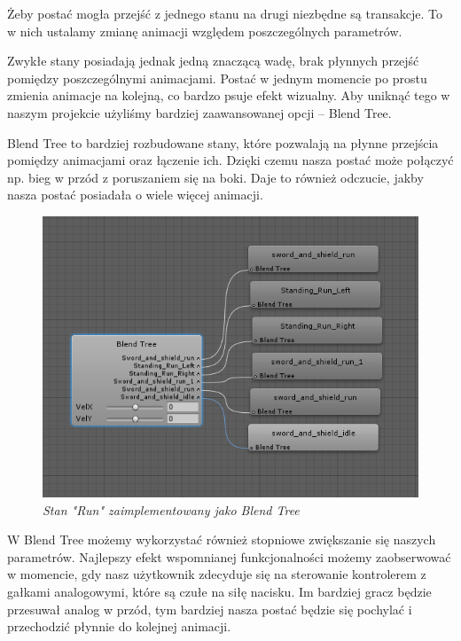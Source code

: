 \documentclass[openright]{xmgr}
\begin{document}
    Żeby postać mogła przejść z jednego stanu na drugi niezbędne są transakcje. To w nich ustalamy zmianę animacji względem poszczególnych parametrów. 

    Zwykłe stany posiadają jednak jedną znaczącą wadę, brak płynnych przejść pomiędzy poszczególnymi animacjami. Postać w jednym momencie po prostu zmienia animacje na kolejną, co bardzo psuje efekt wizualny. Aby uniknąć tego w naszym projekcie użyliśmy bardziej zaawansowanej opcji – Blend Tree.

    Blend Tree to bardziej rozbudowane stany, które pozwalają na płynne przejścia pomiędzy animacjami oraz łączenie ich. Dzięki czemu nasza postać może połączyć np. bieg w przód z poruszaniem się na boki. Daje to również odczucie, jakby nasza postać posiadała o wiele więcej animacji.
    \begin{figure}[H]
        \center
        \includegraphics[width=\textwidth]{blendtree_1.png}
        \caption{ \textit{Stan "Run"  zaimplementowany jako Blend Tree}}
        \end{figure}


    W Blend Tree możemy wykorzystać również stopniowe zwiększanie się naszych parametrów. Najlepszy efekt wspomnianej funkcjonalności możemy zaobserwować w momencie, gdy nasz użytkownik zdecyduje się na sterowanie kontrolerem z gałkami analogowymi, które są czułe na siłę nacisku. Im bardziej gracz będzie przesuwał analog w przód, tym bardziej nasza postać będzie się pochylać i przechodzić płynnie do kolejnej animacji.
\end{document}
